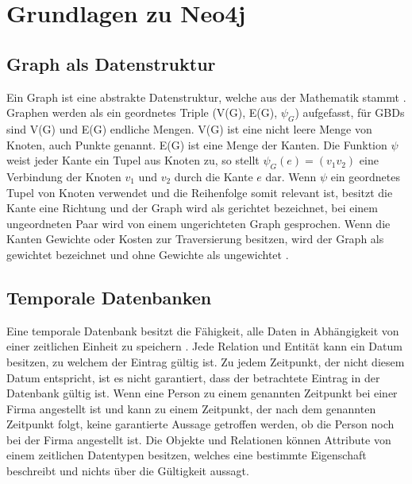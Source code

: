 

\chapter{Grundlagen zu Neo4j} %

\label{Kaptiel 2} %

\section{Graph als Datenstruktur}
Ein Graph ist eine abstrakte Datenstruktur, welche aus der Mathematik stammt \parencite{vicknair2010comparison}. Graphen werden als ein geordnetes Triple (V(G), E(G), $\psi_G$) aufgefasst, für GBDs sind V(G) und E(G) endliche Mengen. V(G) ist eine nicht leere Menge von Knoten, auch Punkte genannt. E(G) ist eine Menge der Kanten. Die Funktion $\psi$ weist jeder Kante ein Tupel aus Knoten zu, so stellt $\psi_G (e) = (v_1 v_2)$ eine Verbindung der Knoten $v_1$ und $v_2$ durch die Kante $e$ dar. Wenn $\psi$ ein geordnetes Tupel von Knoten verwendet und die Reihenfolge somit relevant ist, besitzt die Kante  eine  Richtung und der Graph wird als gerichtet bezeichnet, bei einem ungeordneten Paar wird von einem ungerichteten Graph gesprochen. Wenn die Kanten Gewichte oder Kosten zur Traversierung besitzen, wird der Graph als gewichtet bezeichnet und ohne Gewichte als ungewichtet \parencite{bondy1976graph}.

\section{Temporale Datenbanken}
Eine temporale Datenbank besitzt die Fähigkeit, alle Daten in Abhängigkeit von einer zeitlichen Einheit zu speichern \parencite{campos2016towards}. Jede Relation und Entität kann ein Datum besitzen, zu welchem der Eintrag gültig ist. Zu jedem  Zeitpunkt, der nicht diesem Datum entspricht, ist es nicht garantiert, dass der betrachtete Eintrag in der Datenbank gültig ist. Wenn eine Person zu einem genannten Zeitpunkt bei einer Firma angestellt ist und kann zu einem Zeitpunkt, der nach dem genannten Zeitpunkt folgt, keine garantierte Aussage getroffen werden, ob die Person noch bei der Firma angestellt ist. \newline
Die Objekte und Relationen können Attribute von einem zeitlichen Datentypen besitzen, welches eine bestimmte Eigenschaft beschreibt und nichts über die Gültigkeit aussagt\parencite{khurana2012introduction}.  
